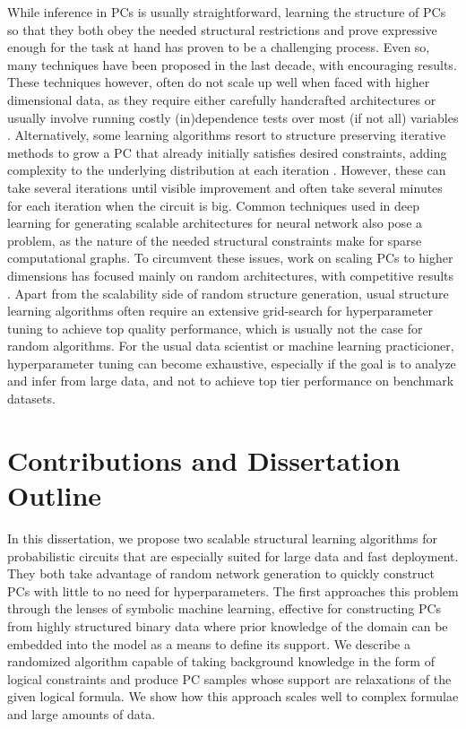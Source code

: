 While inference in PCs is usually straightforward, learning the structure of PCs so that they both
obey the needed structural restrictions and prove expressive enough for the task at hand has proven
to be a challenging process. Even so, many techniques have been proposed in the last decade, with
encouraging results. These techniques however, often do not scale up well when faced with higher
dimensional data, as they require either carefully handcrafted architectures
\citep{poon11,cheng14,nath16} or usually involve running costly (in)dependence tests over most (if
not all) variables \citep{gens13,jaini18a,vergari15,dimauro17a}. Alternatively, some learning
algorithms resort to structure preserving iterative methods to grow a PC that already initially
satisfies desired constraints, adding complexity to the underlying distribution at each iteration
\citep{liang17,dang20}. However, these can take several iterations until visible improvement and
often take several minutes for each iteration when the circuit is big. Common techniques used in
deep learning for generating scalable architectures for neural network also pose a problem, as the
nature of the needed structural constraints make for sparse computational graphs. To circumvent
these issues, work on scaling PCs to higher dimensions has focused mainly on random architectures,
with competitive results \citep{peharz20a,dimauro21,geh21a,peharz20b}. Apart from the scalability
side of random structure generation, usual structure learning algorithms often require an extensive
grid-search for hyperparameter tuning to achieve top quality performance, which is usually not the
case for random algorithms. For the usual data scientist or machine learning practicioner,
hyperparameter tuning can become exhaustive, especially if the goal is to analyze and infer from
large data, and not to achieve top tier performance on benchmark datasets.

\section{Contributions and Dissertation Outline}

In this dissertation, we propose two scalable structural learning algorithms for probabilistic
circuits that are especially suited for large data and fast deployment. They both take advantage of
random network generation to quickly construct PCs with little to no need for hyperparameters. The
first approaches this problem through the lenses of symbolic machine learning, effective for
constructing PCs from highly structured binary data where prior knowledge of the domain can be
embedded into the model as a means to define its support. We describe a randomized algorithm
capable of taking background knowledge in the form of logical constraints and produce PC samples
whose support are relaxations of the given logical formula. We show how this approach scales well
to complex formulae and large amounts of data.

